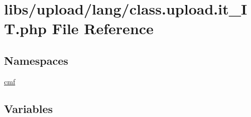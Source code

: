 \hypertarget{class_8upload_8it___i_t_8php}{}\section{libs/upload/lang/class.upload.\+it\+\_\+\+I\+T.\+php File Reference}
\label{class_8upload_8it___i_t_8php}
\subsection*{Namespaces}
\begin{DoxyCompactItemize}
\item 
 \hyperlink{namespacecmf}{cmf}
\end{DoxyCompactItemize}
\subsection*{Variables}
